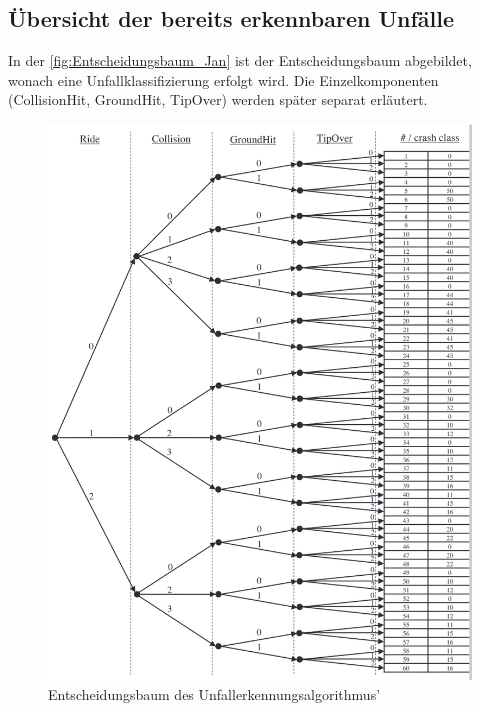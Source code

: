 \subsection{Übersicht der bereits erkennbaren Unfälle}

%

In der \autoref{fig:Entscheidungsbaum_Jan} ist der Entscheidungsbaum abgebildet, wonach eine Unfallklassifizierung erfolgt wird. Die Einzelkomponenten (CollisionHit, GroundHit, TipOver) werden später separat erläutert.
\begin{figure}[H] %
	\centering
	\includegraphics[width=\linewidth]{Bilder/Entscheidungsbaum_Jan.png}
	\caption{Entscheidungsbaum des Unfallerkennungsalgorithmus'\citep{Schneeclassification2021}}
	\label{fig:Entscheidungsbaum_Jan}
\end{figure}

